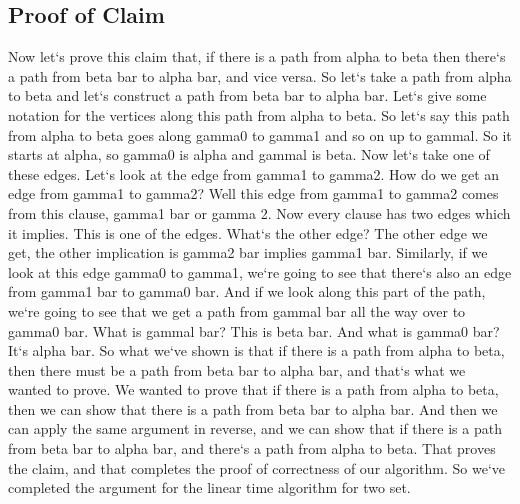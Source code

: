 \subsection{Proof of Claim}
Now let`s prove this claim that, if there is a path from alpha to beta then there`s a path from beta bar to alpha bar, and vice versa.
So let`s take a path from alpha to beta and let`s construct a path from beta bar to alpha bar.
Let`s give some notation for the vertices along this path from alpha to beta.
So let`s say this path from alpha to beta goes along gamma0 to gamma1 and so on up to gammal.
So it starts at alpha, so gamma0 is alpha and gammal is beta.
Now let`s take one of these edges.
Let`s look at the edge from gamma1 to gamma2.
How do we get an edge from gamma1 to gamma2? Well this edge from gamma1 to gamma2 comes from this clause, gamma1 bar or gamma 2.
Now every clause has two edges which it implies.
This is one of the edges.
What`s the other edge? The other edge we get, the other implication is gamma2 bar implies gamma1 bar.
Similarly, if we look at this edge gamma0 to gamma1, we`re going to see that there`s also an edge from gamma1 bar to gamma0 bar.
And if we look along this part of the path, we`re going to see that we get a path from gammal bar all the way over to gamma0 bar.
What is gammal bar? This is beta bar.
And what is gamma0 bar? It`s alpha bar.
So what we`ve shown is that if there is a path from alpha to beta, then there must be a path from beta bar to alpha bar, and that`s what we wanted to prove.
We wanted to prove that if there is a path from alpha to beta, then we can show that there is a path from beta bar to alpha bar.
And then we can apply the same argument in reverse, and we can show that if there is a path from beta bar to alpha bar, and there`s a path from alpha to beta.
That proves the claim, and that completes the proof of correctness of our algorithm.
So we`ve completed the argument for the linear time algorithm for two set.

